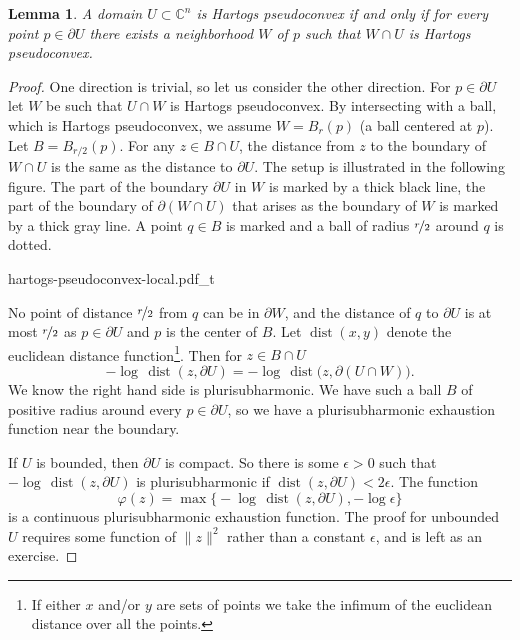 \documentclass[12pt,openany]{book}
\newcommand{\snorm}[1]{\lVert {#1} \rVert}
\newcommand{\C}{{\mathbb{C}}}
\theoremstyle{plain}
\newtheorem{lemma}[thm]{Lemma}
\theoremstyle{remark}
\theoremstyle{definition}
\theoremstyle{exercise}
\theoremstyle{example}
\begin{document}
\begin{lemma}
A domain $U \subset \C^n$ is Hartogs pseudoconvex if and only if
for every point $p \in \partial U$ there exists a neighborhood $W$ of $p$
such that $W \cap U$ is Hartogs pseudoconvex.
\end{lemma}

\begin{proof}
One direction is trivial,
so let us consider the other direction.  For $p \in \partial U$ let
$W$ be such that $U \cap W$
is Hartogs pseudoconvex.  By intersecting with a ball, which is
Hartogs pseudoconvex, we assume $W = B_r(p)$ (a ball centered at $p$).
Let $B = B_{r/2}(p)$.  For
any $z \in B \cap U$, the distance from $z$ to the boundary of $W \cap U$ is the same as
the distance to $\partial U$.  The setup is illustrated in the following
figure.  The part of the boundary $\partial U$ in $W$ is marked by a thick
black line, the part of the boundary of $\partial (W \cap U)$ that arises as
the boundary of $W$ is marked by a thick gray line.  A point $q \in B$ is
marked and a ball of radius $\nicefrac{r}{2}$ around $q$ is dotted.

\begin{center}
{hartogs-pseudoconvex-local.pdf_t}
\end{center}

No point of distance $\nicefrac{r}{2}$ from $q$ can be in $\partial W$, and 
the distance of $q$ to $\partial U$ is at most $\nicefrac{r}{2}$ as $p \in \partial U$
and $p$ is the center of $B$.
Let $\operatorname{dist}(x,y)$ denote the
euclidean distance function\footnote{If either $x$ and/or $y$ are sets
of points we take the infimum of the euclidean distance over all the points.}.
Then for $z \in B \cap U$
\begin{equation*}
- \log \, \operatorname{dist}(z, \partial U) = 
- \log \, \operatorname{dist}\bigl(z, \partial (U \cap W)\bigr).
\end{equation*}
We know the right hand side is plurisubharmonic.  We have such a ball $B$ of
positive radius around every $p \in \partial U$, so we have a
plurisubharmonic
exhaustion function near the boundary.

If $U$ is bounded, then $\partial U$ is compact.  So there is some
$\epsilon > 0$ such that $- \log \, \operatorname{dist}(z, \partial U)$
is plurisubharmonic if $\operatorname{dist}(z, \partial U) < 2\epsilon$.
The function
\begin{equation*}
\varphi(z) = \max \bigl\{
- \log \, \operatorname{dist}(z, \partial U) , - \log \epsilon \bigr\} 
\end{equation*}
is a continuous plurisubharmonic exhaustion function.  The proof for
unbounded $U$ requires some function of $\snorm{z}^2$ rather than a constant
$\epsilon$,
and is left as an exercise.
\end{proof}
\end{document}
